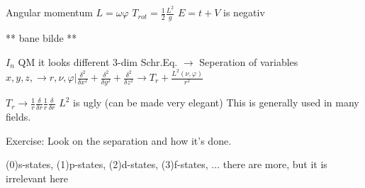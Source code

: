 \documentclass[a4paper,10pt]{report}
\begin{document}
Angular momentum
$L = \omega \varphi$ $T_{rot} = \frac{1}{2} \frac{L^2}{g}$
$E=t+V$ is negativ

 ** bane bilde **

$I_n$ QM it looks different
3-dim Schr.Eq. $\rightarrow$ Seperation of variables
$x, y, z, \rightarrow r, \nu , \varphi | \frac{\delta ^2}{\delta x^2}+\frac{\delta ^2}{\delta y^2}+\frac{\delta ^2}{\delta z^2} \longrightarrow T_r +\frac{L^2(\nu , \varphi )}{r^2}$

$T_r \longrightarrow \frac{1}{r}\frac{\delta}{\delta r}\frac{1}{r}\frac{\delta}{\delta r}$ $L^2$ is ugly (can be made very elegant)
This is generally used in many fields.

Exercise:
Look on the separation and how it's done.

(0)s-states, (1)p-states, (2)d-states, (3)f-states, ... there are more, but it is irrelevant here
\end{document}
